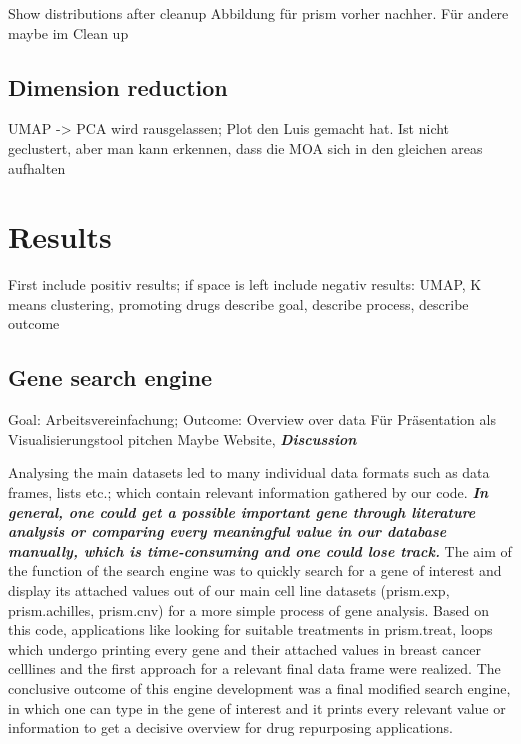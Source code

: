 \documentclass[
  11pt,
]{article}
\begin{document}
Show distributions after cleanup Abbildung für prism vorher nachher. Für
andere maybe im Clean up

\hypertarget{dimension-reduction}{%
\subsection{Dimension reduction}\label{dimension-reduction}}

UMAP -\textgreater{} PCA wird rausgelassen; Plot den Luis gemacht hat.
Ist nicht geclustert, aber man kann erkennen, dass die MOA sich in den
gleichen areas aufhalten

\hypertarget{results}{%
\section{Results}\label{results}}

First include positiv results; if space is left include negativ results:
UMAP, K means clustering, promoting drugs describe goal, describe
process, describe outcome

\hypertarget{gene-search-engine}{%
\subsection{Gene search engine}\label{gene-search-engine}}

Goal: Arbeitsvereinfachung; Outcome: Overview over data Für Präsentation
als Visualisierungstool pitchen Maybe Website,
\textbf{\emph{Discussion}}

Analysing the main datasets led to many individual data formats such as
data frames, lists etc.; which contain relevant information gathered by
our code. \textbf{\emph{In general, one could get a possible important
gene through literature analysis or comparing every meaningful value in
our database manually, which is time-consuming and one could lose
track.}} The aim of the function of the search engine was to quickly
search for a gene of interest and display its attached values out of our
main cell line datasets (prism.exp, prism.achilles, prism.cnv) for a
more simple process of gene analysis. Based on this code, applications
like looking for suitable treatments in prism.treat, loops which undergo
printing every gene and their attached values in breast cancer celllines
and the first approach for a relevant final data frame were realized.
The conclusive outcome of this engine development was a final modified
search engine, in which one can type in the gene of interest and it
prints every relevant value or information to get a decisive overview
for drug repurposing applications.
\end{document}
